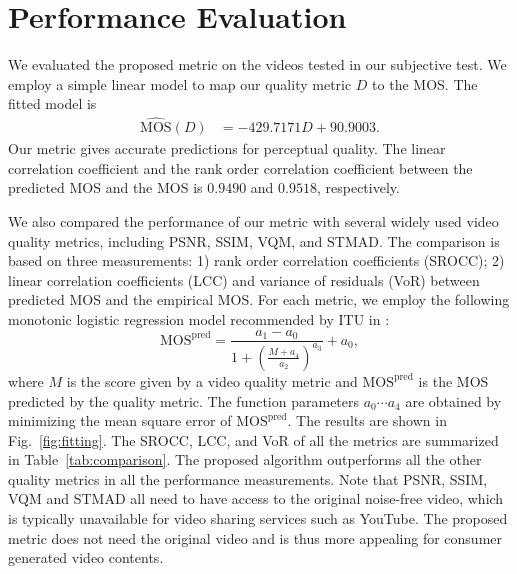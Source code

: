 \documentclass{sig-alternate}
\begin{document}
\section{Performance Evaluation}
\label{sec:experiment}
We evaluated the proposed metric on the videos tested in our subjective test. We employ a simple linear model to map our quality metric $D$ to the MOS. The fitted model is  
\begin{align*}
\label{eq:mos_mapping}
\mathrm{\hat{MOS}}(D) & = -429.7171D + 90.9003.
\end{align*}
Our metric gives accurate predictions for perceptual quality. The linear correlation coefficient and the rank order correlation coefficient between the predicted MOS and the MOS is $0.9490$ and $0.9518$, respectively.


We also compared the performance of our metric with several widely used video quality metrics, including PSNR, SSIM, VQM, and STMAD. The comparison is based on three measurements: 1) rank order correlation coefficients (SROCC); 2) linear correlation coefficients (LCC) and variance of residuals (VoR) between predicted MOS and the empirical MOS. For each metric, we employ the following monotonic logistic regression model recommended by ITU in \cite{ITUValidation}:
\begin{equation}
\label{eq:regression}
\mathrm{MOS^{pred}} = \frac{a_1-a_0}{1+\left(\frac{M+a_4}{a_2}\right)^{a_3}} + a_0,
\end{equation}
where $M$ is the score given by a video quality metric and $\mathrm{MOS^{pred}}$ is the MOS predicted by the quality metric. The function parameters $a_0\cdots a_4$ are obtained by minimizing the mean square error of $\mathrm{MOS^{pred}}$. The results are shown in Fig.~\ref{fig:fitting}. The SROCC, LCC, and VoR of all the metrics are summarized in Table~\ref{tab:comparison}. The proposed algorithm outperforms all the other quality metrics in all the performance measurements. Note that PSNR, SSIM, VQM and STMAD all need to have access to the original noise-free video, which is typically unavailable for video sharing services such as YouTube. The proposed metric does not need the original video and is thus more appealing for consumer generated video contents.
\end{document}
